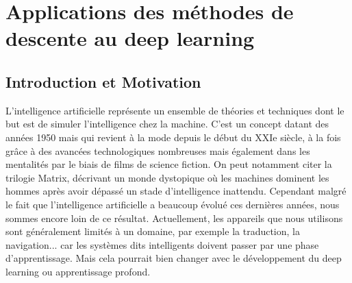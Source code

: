 \chapter{Applications des méthodes de descente au deep learning}
\section{Introduction et Motivation}
L'intelligence artificielle représente un ensemble de théories et techniques dont le but est de simuler l'intelligence chez la machine. C'est un concept datant des années 1950 mais qui revient à la mode depuis le début du XXIe siècle, à la fois grâce à des avancées technologiques nombreuses mais également dans les mentalités par le biais de films de science fiction. On peut notamment citer la trilogie Matrix, décrivant un monde dystopique où les machines dominent les hommes après avoir dépassé un stade d'intelligence inattendu. Cependant malgré le fait que l'intelligence artificielle a beaucoup évolué ces dernières années, nous sommes encore loin de ce résultat. Actuellement, les appareils que nous utilisons sont généralement limités à un domaine, par exemple la traduction, la navigation... car les systèmes dits intelligents doivent passer par une phase d'apprentissage. Mais cela pourrait bien changer avec le développement du deep learning ou apprentissage profond.

